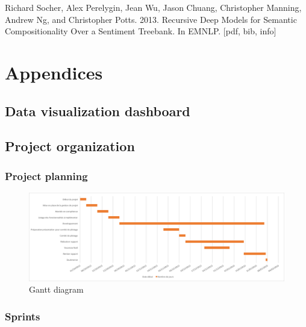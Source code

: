 \documentclass[11pt]{article}
\begin{document}
Richard Socher, Alex Perelygin, Jean Wu, Jason Chuang, Christopher Manning, Andrew Ng, and Christopher Potts. 2013. Recursive Deep Models for Semantic Compositionality Over a Sentiment Treebank. In EMNLP. [pdf, bib, info]


\newpage
{}
\section{Appendices}

\subsection{Data visualization dashboard}

\subsection{Project organization}

\subsubsection{Project planning}

\begin{figure}[h!]
    \centering
    \includegraphics[scale=0.5]{img/gantt.png}
    \caption{Gantt diagram}
    \label{gantt}
\end{figure}

\subsubsection{Sprints}
\end{document}
